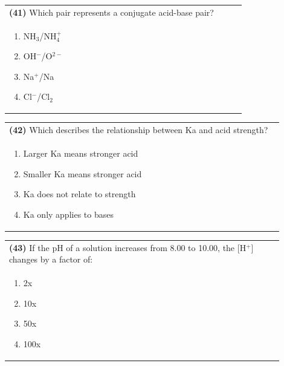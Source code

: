 \documentclass{article}
\begin{document}
\noindent\begin{tabular}{|p{0.9\linewidth}|}
\hline
\textbf{(41)} Which pair represents a conjugate acid-base pair?\\[0.2cm]
\begin{minipage}[t]{0.85\linewidth}
\begin{enumerate}[label=\alph*.]
\item NH$_3$/NH$_4^+$
\item OH$^-$/O$^{2-}$
\item Na$^+$/Na
\item Cl$^-$/Cl$_2$
\end{enumerate}
\end{minipage}\\[0.2cm]
\hline
\end{tabular}

\noindent\begin{tabular}{|p{0.9\linewidth}|}
\hline
\textbf{(42)} Which describes the relationship between Ka and acid strength? \\[0.2cm]
\begin{minipage}{0.85\linewidth}
\begin{enumerate}[label=\alph*.]
\item Larger Ka means stronger acid \item Smaller Ka means stronger acid \item Ka does not relate to strength \item Ka only applies to bases
\end{enumerate}
\end{minipage}\\[0.2cm]
\hline
\end{tabular}

\noindent\begin{tabular}{|p{0.9\linewidth}|}
\hline
\textbf{(43)} If the pH of a solution increases from 8.00 to 10.00, the [H$^+$] changes by a factor of: \\[0.2cm]
\begin{minipage}{0.85\linewidth}
\begin{enumerate}[label=\alph*.]
\item 2x \item 10x \item 50x \item 100x
\end{enumerate}
\end{minipage}\\[0.2cm]
\hline
\end{tabular}
\end{document}
